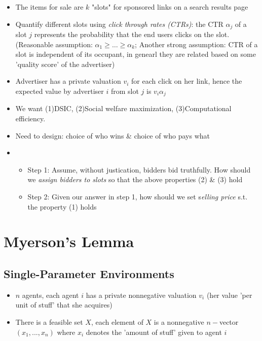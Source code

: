 \documentclass[10pt]{article}
\theoremstyle{definition}
\begin{document}
\begin{itemize}
	\item The items for sale are $k$ "slots" for sponsored links on a search results page
	\item Quantify different slots using \textit{click through rates (CTRs)}: the CTR $\alpha_{j}$ of a slot $j$ represents the
	      probability that the end users clicks on the slot. (Reasonable assumption: $\alpha_{1} \ge \dots \ge \alpha_{k}$;
	      Another strong assumption: CTR of a slot is independent of its occupant, in genearl they are related based on some 'quality score'
	      of the advertiser)
	\item Advertiser has a private valuation $v_{i}$ for each click on her link,
	      hence the expected value by advertiser $i$ from slot $j$ is $v_{i}\alpha_{j}$
	\item We want (1)DSIC, (2)Social welfare maximization, (3)Computational efficiency.
	\item Need to design: choice of who wins \& choice of who pays what
	\item \begin{itemize}
		      \item Step 1: Assume, without justication, bidders bid truthfully. How should we \textit{assign bidders to slots} so that
		            the above properties (2) \& (3) hold
		      \item Step 2: Given our answer in step 1, how should we set s\textit{elling price} s.t. the property (1) holds
	      \end{itemize}
\end{itemize}

\section{Myerson's Lemma}

\subsection{Single-Parameter Environments}
\begin{itemize}
	\item $n$ agents, each agent $i$ has a private nonnegative valuation $v_{i}$ (her value 'per unit of stuff' that she acquires)
	\item There is a feasible set $X$, each element of $X$ is a nonnegative $n-$vector $(x_{1}, ..., x_{n})$ where $x_{i}$ denotes the
	      'amount of stuff' given to agent $i$
\end{itemize}
\end{document}
